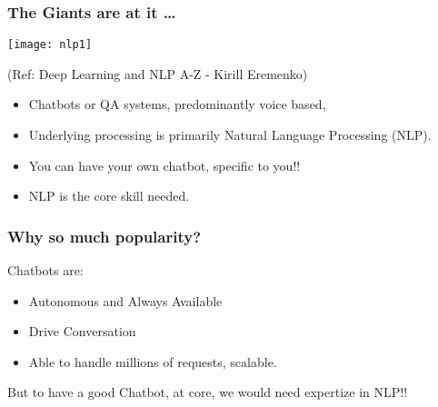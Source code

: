 \begin{frame}[fragile]\frametitle{The Giants are at it \ldots}
\begin{center}
\texttt{[image: nlp1]}

\tiny{(Ref: Deep Learning and NLP A-Z - Kirill Eremenko)}
\end{center}

	\begin{itemize}
	\item Chatbots or QA systems, predominantly voice based, 
	\item Underlying processing is primarily Natural Language Processing (NLP).
	\item You can have your own chatbot, specific to you!! 
	\item NLP is the core skill needed.
	\end{itemize}
	
\end{frame}


\begin{frame}[fragile]\frametitle{Why so much popularity?}
Chatbots are:
	\begin{itemize}
	\item Autonomous and Always Available
	\item Drive Conversation
	\item Able to handle millions of requests, scalable.
	\end{itemize}
	
But to have a good Chatbot, at core, we would need expertize in NLP!!

\end{frame}







